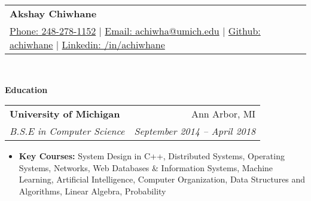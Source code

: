 \documentclass[letterpaper,11pt]{article}
\makeatletter
\newcommand{\resitem}[1]{\item #1 \vspace{-2pt}}
\newcommand{\resheading}[1]{{\large \colorbox{mygrey}{\begin{minipage}{\textwidth}{\textbf{#1 \vphantom{p\^{E}}}}\end{minipage}}}}
\newcommand{\ressubheading}[4]{
\begin{tabular*}{6.875in}{l@{\extracolsep{\fill}}r}
		\textbf{#1} & #2 \\
		\textit{#3} & \textit{#4} \\
\end{tabular*}\vspace{-6pt}}
\renewcommand{\footnotesize}{\fontsize{10pt}{11pt}\selectfont}
\makeatother
\begin{document}
\newcommand{\mywebheader}{
	\begin{tabular*}{7in}{l@{\extracolsep{\fill}}r}
		\textbf{{\LARGE Akshay Chiwhane}} \\
		\href{tel:248-278-1152}{Phone: 248-278-1152} |
		\href{mailto:achiwha@umich.edu}{Email: achiwha@umich.edu} |
		\href{https://github.com/achiwhane}{Github: achiwhane} |
		\href{https://linkedin.com/in/achiwhane}{Linkedin: /in/achiwhane}	\end{tabular*}
		\\
		\vspace{0.1in}}
						
		\mywebheader
						
		\resheading{Education}
		\begin{description}
			\item
			\ressubheading{{University of Michigan}}{Ann Arbor, MI}{B.S.E in Computer Science}{September 2014 -- April 2018}
			{ \footnotesize
				\begin{itemize}
					\resitem{\textbf{Key Courses:}
						System Design in C++,
						Distributed Systems,
						Operating Systems, 
						Networks,
						Web Databases \& Information Systems,
						Machine Learning,
						Artificial Intelligence,
						Computer Organization,
						Data Structures and Algorithms,
						Linear Algebra,
						Probability
					}
				\end{itemize}
			}
		\end{description} %
						
\end{document}
